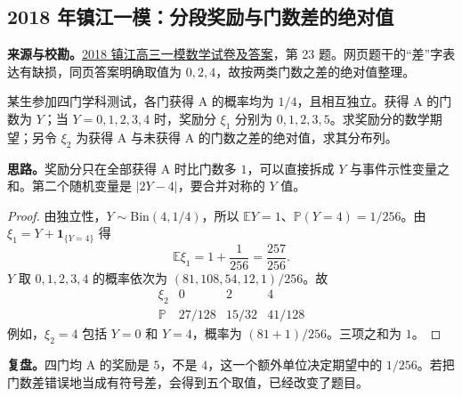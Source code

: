 \documentclass[UTF8,12pt,a4paper,fontset=fandol]{ctexart}
\begin{document}
\subsection{2018 年镇江一模：分段奖励与门数差的绝对值}\label{sec:c2018zj1}
\textbf{来源与校勘。}\href{https://yn.qinxue100.com/news/gz/20180305/59236.html}{2018 镇江高三一模数学试卷及答案}，第 23 题。网页题干的“差”字表达有缺损，同页答案明确取值为 $0,2,4$，故按两类门数之差的绝对值整理。
\begin{example}[题意]
某生参加四门学科测试，各门获得 A 的概率均为 $1/4$，且相互独立。获得 A 的门数为 $Y$；当 $Y=0,1,2,3,4$ 时，奖励分 $\xi_1$ 分别为 $0,1,2,3,5$。求奖励分的数学期望；另令 $\xi_2$ 为获得 A 与未获得 A 的门数之差的绝对值，求其分布列。
\end{example}
\textbf{思路。}奖励分只在全部获得 A 时比门数多 $1$，可以直接拆成 $Y$ 与事件示性变量之和。第二个随机变量是 $|2Y-4|$，要合并对称的 $Y$ 值。
\begin{proof}
由独立性，$Y\sim\mathrm{Bin}(4,1/4)$，所以 $\mathbb EY=1$、$\mathbb P(Y=4)=1/256$。由 $\xi_1=Y+\mathbf1_{\{Y=4\}}$ 得
\[
\boxed{\mathbb E\xi_1=1+\frac1{256}=\frac{257}{256}}.
\]
$Y$ 取 $0,1,2,3,4$ 的概率依次为 $(81,108,54,12,1)/256$。故
\[
\begin{array}{c|ccc}
\xi_2&0&2&4\\\hline
\mathbb P&27/128&15/32&41/128
\end{array}
\]
例如，$\xi_2=4$ 包括 $Y=0$ 和 $Y=4$，概率为 $(81+1)/256$。三项之和为 $1$。
\end{proof}
\textbf{复盘。}四门均 A 的奖励是 $5$，不是 $4$，这一个额外单位决定期望中的 $1/256$。若把门数差错误地当成有符号差，会得到五个取值，已经改变了题目。
\end{document}

